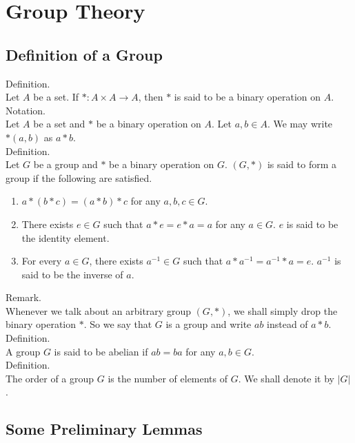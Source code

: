 \documentclass[twocolumn]{article}
\newcommand{\br}{\vspace{\baselineskip}}
\begin{document}
\section{Group Theory}

\subsection{Definition of a Group}

Definition. \\
Let $A$ be a set. If $*: A \times A \rightarrow A$, then $*$ is said to be a binary operation on $A$. \\

Notation. \\
Let $A$ be a set and $*$ be a binary operation on $A$. Let $a, b \in A$. We may write $*(a, b)$ as $a * b$. \\

Definition. \\
Let $G$ be a group and $*$ be a binary operation on $G$. $(G, *)$ is said to form a group if the following are satisfied.
\begin{enumerate}
	\item
	$a * (b * c) = (a * b) * c$ for any $a, b, c \in G$.
	\item
	There exists $e \in G$ such that $a * e = e * a = a$ for any $a \in G$. $e$ is said to be the identity element.
	\item
	For every $a \in G$, there exists $a^{-1} \in G$ such that $a * a^{-1} = a^{-1} * a = e$. $a^{-1}$ is said to be the inverse of $a$.
\end{enumerate} \br

Remark. \\
Whenever we talk about an arbitrary group $(G, *)$, we shall simply drop the binary operation $*$. So we say that $G$ is a group and write $ab$ instead of $a * b$. \\

Definition. \\
A group $G$ is said to be abelian if $ab = ba$ for any $a, b \in G$. \\

Definition. \\
The order of a group $G$ is the number of elements of $G$. We shall denote it by $|G|$. \\

\subsection{Some Preliminary Lemmas}
\end{document}
